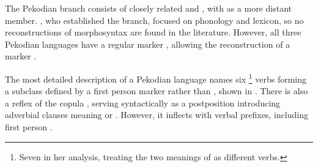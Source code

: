 \subsubsection{\PPek {}}
\label{sec:pekodian}
The Pekodian branch consists of closely related \arara and \ikpeng, with \bakairi as a more distant member.
\textcite{meira2005southern}, who established the branch, focused on phonology and lexicon, so no reconstructions of \PPek morphosyntax are found in the literature.
However, all three Pekodian languages have a regular  marker  , allowing the reconstruction of a \PPek {} marker .




The most detailed description of a Pekodian language \parencite{alves2017arara} names six%
\footnote{Seven in her analysis, treating the two meanings of   as different verbs.}
\arara {} verbs forming a subclass defined by a first person marker  rather than , shown in .
There is also a reflex of the copula  , serving syntactically as a postposition introducing adverbial clauses meaning  or  \parencite[199--201]{alves2017arara}.
However, it inflects with verbal \setone prefixes, including first person  .

